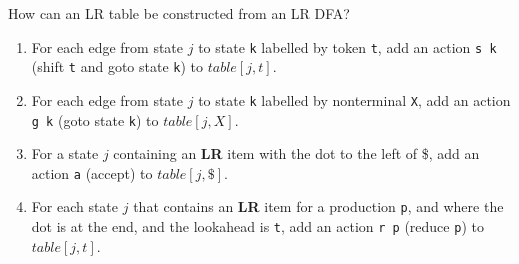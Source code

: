 \documentclass[11pt]{beamer}
\begin{document}
\begin{frame}

\begin{block}{How can an LR table be constructed from an LR DFA?}
\begin{enumerate}
\item For each edge from state $j$ to state \texttt{k} labelled by token \texttt{t}, add an action \texttt{s k} (shift \texttt{t} and goto state \texttt{k}) to $table[j,t]$.
\item For each edge from state $j$ to state \texttt{k} labelled by nonterminal \texttt{X}, add an action \texttt{g k} (goto state \texttt{k}) to $table[j,X]$.
\item For a state $j$ containing an \textbf{LR} item with the dot to the left of \$, add an action \texttt{a} (accept) to $table[j,\$]$.
\item For each state $j$ that contains an \textbf{LR} item for a production \texttt{p}, and where the dot is at the end, and the lookahead is \texttt{t}, add an action \texttt{r p} (reduce \texttt{p}) to $table[j,t]$.
\end{enumerate}
\end{block}

\end{frame}
\end{document}
